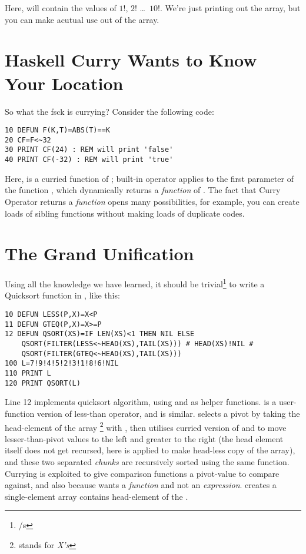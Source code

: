 Here,  will contain the values of $1!$, $2!$ \ldots\ $10!$. We're just printing out the array, but you can make acutual use out of the array.

\section[Currying]{Haskell Curry Wants to Know Your Location}
\label{currying101}

So what the fsck is currying? Consider the following code:

\begin{lstlisting}
10 DEFUN F(K,T)=ABS(T)==K
20 CF=F<~32
30 PRINT CF(24) : REM will print 'false'
40 PRINT CF(-32) : REM will print 'true'
\end{lstlisting}

Here,  is a curried function of ; built-in operator \code{$<\!\sim$} applies  to the first parameter of the function , which dynamically returns a \emph{function} of . The fact that Curry Operator returns a \emph{function} opens many possibilities, for example, you can create loads of sibling functions without making loads of duplicate codes.

\section[Wrapping-Up]{The Grand Unification}

Using all the knowledge we have learned, it should be trivial\footnote{/s} to write a Quicksort function in \tbas, like this:

\begin{lstlisting}
10 DEFUN LESS(P,X)=X<P
11 DEFUN GTEQ(P,X)=X>=P
12 DEFUN QSORT(XS)=IF LEN(XS)<1 THEN NIL ELSE 
    QSORT(FILTER(LESS<~HEAD(XS),TAIL(XS))) # HEAD(XS)!NIL # 
    QSORT(FILTER(GTEQ<~HEAD(XS),TAIL(XS)))
100 L=7!9!4!5!2!3!1!8!6!NIL
110 PRINT L
120 PRINT QSORT(L)
\end{lstlisting}

Line 12 implements quicksort algorithm, using  and  as helper functions.  is a user-function version of less-than operator, and  is similar.  selects a pivot by taking the head-element of the array \footnote{stands for \emph{X's}} with , then utilises curried version of  and  to move lesser-than-pivot values to the left and greater to the right (the head element itself does not get recursed, here  is applied to make head-less copy of the array), and these two separated \emph{chunks} are recursively sorted using the same  function. Currying is exploited to give comparison functions a pivot-value to compare against, and also because  wants a \emph{function} and not an \emph{expression}.  creates a single-element array contains head-element of the .

